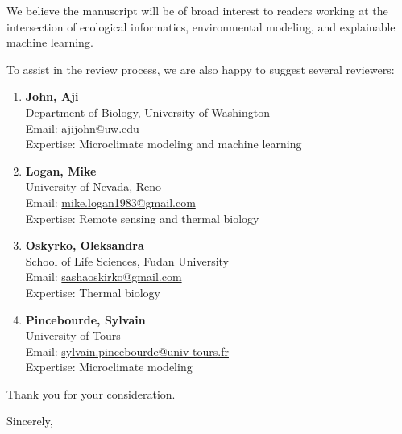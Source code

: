 \documentclass[12pt]{letter}
\begin{document}
\begin{letter}{}
We believe the manuscript will be of broad interest to readers working at the intersection of ecological informatics, environmental modeling, and explainable machine learning.

To assist in the review process, we are also happy to suggest several reviewers:
\begin{enumerate}
    \item \textbf{John, Aji} \\
    Department of Biology, University of Washington \\
    Email: \href{mailto:ajijohn@uw.edu}{ajijohn@uw.edu} \\
    Expertise: Microclimate modeling and machine learning
    \item \textbf{Logan, Mike} \\
    University of Nevada, Reno \\
    Email: \href{mailto:mike.logan1983@gmail.com}{mike.logan1983@gmail.com} \\
    Expertise: Remote sensing and thermal biology
    \item \textbf{Oskyrko, Oleksandra} \\
    School of Life Sciences, Fudan University \\
    Email: \href{mailto:sashaoskirko@gmail.com}{sashaoskirko@gmail.com} \\
    Expertise: Thermal biology
    \item \textbf{Pincebourde, Sylvain} \\
    University of Tours \\
    Email: \href{mailto:sylvain.pincebourde@univ-tours.fr}{sylvain.pincebourde@univ-tours.fr} \\
    Expertise: Microclimate modeling
\end{enumerate}

Thank you for your consideration.

\closing{Sincerely,}

\end{letter}
\end{document}
